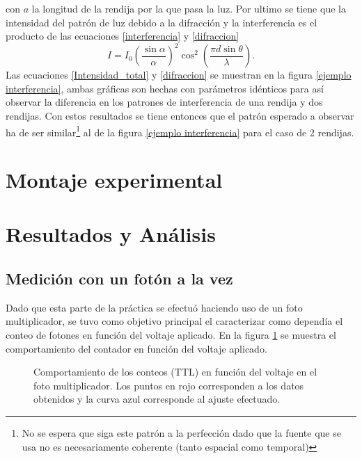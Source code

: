\documentclass[%
 reprint,
 amsmath,amssymb,
 aps,
]{revtex4-1}
\begin{document}
con $a$ la longitud de la rendija por la que pasa la luz. Por ultimo se tiene que la intensidad del patrón de luz debido a la difracción y la interferencia es el producto de las ecuaciones \eqref{interferencia} y \eqref{difraccion}
\begin{equation}
I=I_0\left(\frac{\sin\alpha}{\alpha}\right)^2\cos^2\left(\frac{\pi d \sin\theta}{\lambda}\right).
\label{Intensidad_total}
\end{equation}
Las ecuaciones \eqref{Intensidad_total} y \eqref{difraccion} se muestran en la figura \ref{ejemplo interferencia}, ambas gráficas son hechas con parámetros idénticos para así observar la diferencia en los patrones de interferencia de una rendija y dos rendijas. Con estos resultados se tiene entonces que el patrón esperado a observar ha de ser similar\footnote{No se espera que siga este patrón a la perfección dado que la fuente que se usa no es necesariamente coherente (tanto espacial como temporal)} al de la figura \ref{ejemplo interferencia} para el caso de 2 rendijas. 
\section{Montaje experimental}
\section{Resultados y Análisis}
\subsection{Medición con un fotón a la vez}
Dado que esta parte de la práctica se efectuó haciendo uso de un foto multiplicador, se tuvo como objetivo principal el caracterizar como dependía el conteo de fotones en función del voltaje aplicado. En la figura \ref{fotomultiplicador} se muestra el comportamiento del contador en función del voltaje aplicado.

\begin{figure}[ht]
\caption{\label{fotomultiplicador}Comportamiento de los conteos (TTL) en función del voltaje en el foto multiplicador. Los puntos en rojo corresponden a los datos obtenidos y la curva azul corresponde al ajuste efectuado.}
\end{figure}
\end{document}
